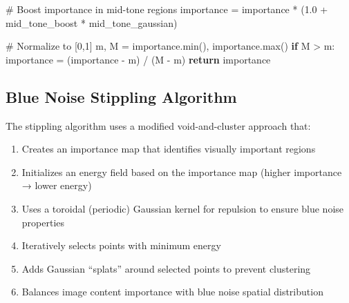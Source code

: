 \documentclass[
  letterpaper,
  DIV=11,
  numbers=noendperiod]{scrartcl}
\newenvironment{Shaded}{\begin{snugshade}}{\end{snugshade}}
\newcommand{\BuiltInTok}[1]{\textcolor[rgb]{0.00,0.23,0.31}{#1}}
\newcommand{\CommentTok}[1]{\textcolor[rgb]{0.37,0.37,0.37}{#1}}
\newcommand{\ControlFlowTok}[1]{\textcolor[rgb]{0.00,0.23,0.31}{\textbf{#1}}}
\newcommand{\FloatTok}[1]{\textcolor[rgb]{0.68,0.00,0.00}{#1}}
\newcommand{\NormalTok}[1]{\textcolor[rgb]{0.00,0.23,0.31}{#1}}
\newcommand{\OperatorTok}[1]{\textcolor[rgb]{0.37,0.37,0.37}{#1}}
\providecommand{\tightlist}{%
  \setlength{\itemsep}{0pt}\setlength{\parskip}{0pt}}
\begin{document}
\begin{Shaded}
\begin{Highlighting}[]
    \CommentTok{\# Boost importance in mid{-}tone regions}
\NormalTok{    importance }\OperatorTok{=}\NormalTok{ importance }\OperatorTok{*}\NormalTok{ (}\FloatTok{1.0} \OperatorTok{+}\NormalTok{ mid\_tone\_boost }\OperatorTok{*}\NormalTok{ mid\_tone\_gaussian)}
    
    \CommentTok{\# Normalize to [0,1]}
\NormalTok{    m, M }\OperatorTok{=}\NormalTok{ importance.}\BuiltInTok{min}\NormalTok{(), importance.}\BuiltInTok{max}\NormalTok{()}
    \ControlFlowTok{if}\NormalTok{ M }\OperatorTok{\textgreater{}}\NormalTok{ m: }
\NormalTok{        importance }\OperatorTok{=}\NormalTok{ (importance }\OperatorTok{{-}}\NormalTok{ m) }\OperatorTok{/}\NormalTok{ (M }\OperatorTok{{-}}\NormalTok{ m)}
    \ControlFlowTok{return}\NormalTok{ importance}
\end{Highlighting}
\end{Shaded}

\subsection{Blue Noise Stippling
Algorithm}\label{blue-noise-stippling-algorithm}

The stippling algorithm uses a modified void-and-cluster approach that:

\begin{enumerate}
\def\labelenumi{\arabic{enumi}.}
\tightlist
\item
  Creates an importance map that identifies visually important regions
\item
  Initializes an energy field based on the importance map (higher
  importance → lower energy)
\item
  Uses a toroidal (periodic) Gaussian kernel for repulsion to ensure
  blue noise properties
\item
  Iteratively selects points with minimum energy
\item
  Adds Gaussian ``splats'' around selected points to prevent clustering
\item
  Balances image content importance with blue noise spatial distribution
\end{enumerate}
\end{document}
